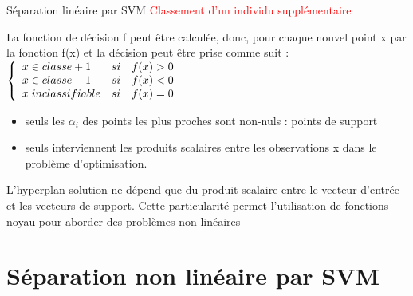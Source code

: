 \documentclass{bredelebeamer}
\begin{document}
\begin{frame}{Séparation linéaire par SVM}
\textcolor{red}{Classement d’un individu supplémentaire}\vspace{1\baselineskip}
 
      La fonction de décision f peut être calculée, donc, pour chaque nouvel point x par la fonction f(x) et la décision peut être prise comme suit : \vspace{1\baselineskip}\\
      $\left\{ \begin{array}{lcc}
x\in classe +1 & si & f(x)>0\\
x\in classe -1 & si &f(x)< 0\\
 x \hspace*{0.1 cm} inclassifiable & si& f(x) =0\\
\end{array}\right.$\\
\begin{itemize}
      \item seuls les $\alpha_i$ des points les plus proches sont non-nuls : points de support  \\
      \item seuls interviennent les produits scalaires entre les observations x dans le problème d’optimisation. \\
\end{itemize}
L’hyperplan solution ne dépend que du produit scalaire entre le vecteur d’entrée et les vecteurs de support. Cette particularité permet l’utilisation de fonctions noyau pour aborder des problèmes non linéaires    
\end{frame}

\section{Séparation non linéaire par SVM}
\end{document}
